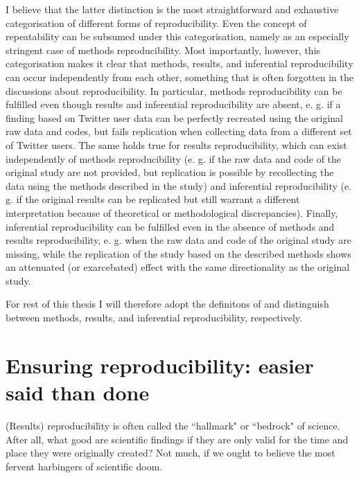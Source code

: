 \documentclass[11pt, a4paper,twoside]{report}\usepackage[]{graphicx}\usepackage[]{color}
\begin{document}
I believe that the latter distinction is the most straightforward and exhaustive categorisation of different forms of reproducibility. Even the concept of repeatability can be subsumed under this categorisation, namely as an especially stringent case of methods reproducibility. Most importantly, however, this categorisation makes it clear that methods, results, and inferential reproducibility can occur independently from each other, something that is often forgotten in the discussions about reproducibility. In particular, methods reproducibility can be fulfilled even though results and inferential reproducibility are absent, e. g. if a finding based on Twitter user data can be perfectly recreated using the original raw data and codes, but fails replication when collecting data from a different set of Twitter users. The same holds true for results reproducibility, which can exist independently of methods reproducibility (e. g. if the raw data and code of the original study are not provided, but replication is possible by recollecting the data using the methods described in the study) and inferential reproducibility (e. g. if the original results can be replicated but still warrant a different interpretation because of theoretical or methodological discrepancies). Finally, inferential reproducibility can be fulfilled even in the absence of methods and results reproducibility, e. g. when the raw data and code of the original study are missing, while the replication of the study based on the described methods shows an attenuated (or exarcebated) effect with the same directionality as the original study.

For rest of this thesis I will therefore adopt the definitons of \cite{goodman_what_2016} and distinguish between methods, results, and inferential reproducibility, respectively.

\section{Ensuring reproducibility: easier said than done}
(Results) reproducibility is often called the ``hallmark" \citep{aarts2015estimating,munafo_manifesto_2017} or ``bedrock" \citep{casadevall_reproducible_2010} of science. After all, what good are scientific findings if they are only valid for the time and place they were originally created? Not much, if we ought to believe the most fervent harbingers of scientific doom.
\end{document}
